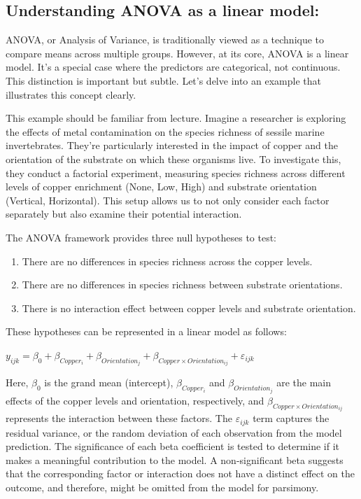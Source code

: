 \documentclass[
  letterpaper,
  DIV=11,
  numbers=noendperiod]{scrreprt}
\begin{document}
\subsection{Understanding ANOVA as a linear
model:}\label{understanding-anova-as-a-linear-model}

ANOVA, or Analysis of Variance, is traditionally viewed as a technique
to compare means across multiple groups. However, at its core, ANOVA is
a linear model. It's a special case where the predictors are
categorical, not continuous. This distinction is important but subtle.
Let's delve into an example that illustrates this concept clearly.

This example should be familiar from lecture. Imagine a researcher is
exploring the effects of metal contamination on the species richness of
sessile marine invertebrates. They're particularly interested in the
impact of copper and the orientation of the substrate on which these
organisms live. To investigate this, they conduct a factorial
experiment, measuring species richness across different levels of copper
enrichment (None, Low, High) and substrate orientation (Vertical,
Horizontal). This setup allows us to not only consider each factor
separately but also examine their potential interaction.

The ANOVA framework provides three null hypotheses to test:

\begin{enumerate}
\def\labelenumi{\arabic{enumi}.}
\item
  There are no differences in species richness across the copper levels.
\item
  There are no differences in species richness between substrate
  orientations.
\item
  There is no interaction effect between copper levels and substrate
  orientation.
\end{enumerate}

These hypotheses can be represented in a linear model as follows:

\(y_{ijk} = \beta_0 + \beta_{Copper_i} + \beta_{Orientation_j} + \beta_{Copper \times Orientation_{ij}} + \varepsilon_{ijk}\)

Here, \(\beta_0\) is the grand mean (intercept), \(\beta_{Copper_i}\)
and \(\beta_{Orientation_j}\) are the main effects of the copper levels
and orientation, respectively, and
\(\beta_{Copper \times Orientation_{ij}}\) represents the interaction
between these factors. The \(\varepsilon_{ijk}\) term captures the
residual variance, or the random deviation of each observation from the
model prediction. The significance of each beta coefficient is tested to
determine if it makes a meaningful contribution to the model. A
non-significant beta suggests that the corresponding factor or
interaction does not have a distinct effect on the outcome, and
therefore, might be omitted from the model for parsimony.
\end{document}
